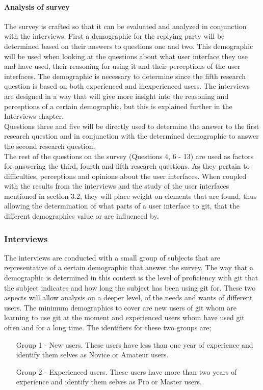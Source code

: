 \documentclass[12pt,a4paper,article,compsoc]{IEEEtran}
\begin{document}
					\paragraph*{Analysis of survey}
					The survey is crafted so that it can be evaluated and analyzed in conjunction with the interviews. 
					First a demographic for the replying party will be determined based on their answers to questions one and two. This demographic will be used when looking at the questions about what user interface they use and have used, their reasoning for using it and their perceptions of the user interfaces. The demographic is necessary to determine since the fifth research question is based on both experienced and inexperienced users. The interviews are designed in a way that will give more insight into the reasoning and perceptions of a certain demographic, but this is explained further in the Interviews chapter.
					\\
					Questions three and five will be directly used to determine the answer to the first research question and in conjunction with the determined demographic to answer the second research question.
					\\
					The rest of the questions on the survey (Questions 4, 6 - 13) are used as factors for answering the third, fourth and fifth research questions. As they pertain to difficulties, perceptions and opinions about the user interfaces. When coupled with the results from the interviews and the study of the user interfaces mentioned in section 3.2, they will place weight on elements that are found, thus allowing the determination of what parts of a user interface to git, that the different demographics value or are influenced by.
				
				\subsubsection{Interviews}
				The interviews are conducted with a small group of subjects that are representative of a certain demographic that answer the survey. The way that a demographic is determined in this context is the level of proficiency with git that the subject indicates and how long the subject has been using git for. 
				These two aspects will allow analysis on a deeper level, of the needs and wants of different users. The minimum demographics to cover are new users of git whom are learning to use git at the moment and experienced users whom have used git often and for a long time. The identifiers for these two groups are;
				\begin{itemize}
					\item[Group 1 - New users.]
					These users have less than one year of experience and identify them selves as Novice or Amateur users.
					\item[Group 2 - Experienced users.]
					These users have more than two years of experience and identify them selves as Pro or Master users.
				\end{itemize}
\end{document}
